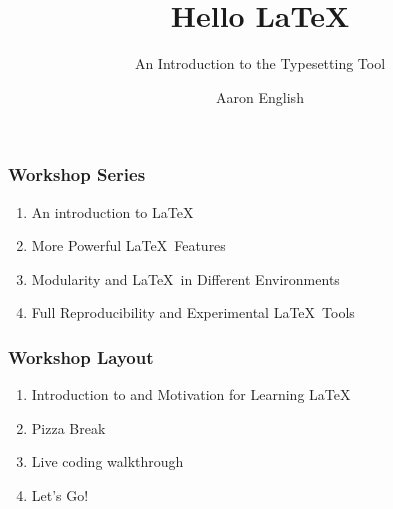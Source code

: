\documentclass{beamer}
\title{Hello \LaTeX}
\subtitle{An Introduction to the Typesetting Tool}
\author{Aaron English}
\date{\DTMusedate{presentation}}
\begin{document}
    \begin{frame}
        \titlepage
    \end{frame}
        \begin{frame}
            \frametitle{Workshop Series}
            \begin{enumerate}[Workshop 1:]
                \addtolength{\itemindent}{4em}
                \item An introduction to \LaTeX
                \item More Powerful \LaTeX~Features
                \item Modularity and \LaTeX~in Different Environments
                \item Full Reproducibility and Experimental \LaTeX~Tools
            \end{enumerate}
        \end{frame}
        \begin{frame}
            \frametitle{Workshop Layout}
            \begin{enumerate}
                \item Introduction to and Motivation for Learning \LaTeX
                \item Pizza Break
                \item Live coding walkthrough
                \item Let's Go!
            \end{enumerate}
        \end{frame}
\end{document}
